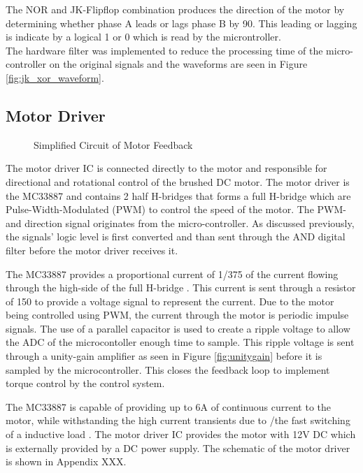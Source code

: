  The NOR and JK-Flipflop combination produces the direction of the motor by determining whether phase A leads or lags phase B by 90\textdegree. This leading or lagging is indicate by a logical 1 or 0 which is read by the microntroller.\\
 
 The hardware filter was implemented to reduce the processing time of the micro-controller on the original signals and the waveforms are seen in Figure \ref{fig:jk_xor_waveform}.



\subsection{Motor Driver}
\begin{figure}[h]
	\centering
	
	\caption{Simplified Circuit of Motor Feedback}
	\label{fig:feedback_current}
\end{figure}

The motor driver IC is connected directly to the motor and responsible for directional and rotational control of the brushed DC motor. The motor driver is the MC33887 and contains 2 half H-bridges that forms a full H-bridge which are Pulse-Width-Modulated (PWM) to control the speed of the motor. The PWM- and direction signal originates from the micro-controller. As discussed previously, the signals' logic level is first converted and than sent through the AND digital filter before the motor driver receives it.

The MC33887 provides a proportional current of 1/375 of the current flowing through the high-side of the full H-bridge \citep{motorIC}. This current is sent through a resistor of \SI{150}{\Omega} to provide a voltage signal to represent the current. Due to the motor being controlled using PWM, the current through the motor is periodic impulse signals. The use of a parallel capacitor is used to create a ripple voltage to allow the ADC of the microcontoller enough time to sample. This ripple voltage is sent through a unity-gain amplifier as seen in Figure \ref{fig:unitygain} before it is sampled by the microcontroller. This closes the feedback loop to implement torque control by the control system.

The MC33887 is capable of providing up to 6A of continuous current to the motor, while withstanding the high current transients due to /the fast switching of a inductive load \citep{motorIC}. The motor driver IC provides the motor with 12V DC which is externally provided by a DC power supply. The schematic of the motor driver is shown in Appendix XXX.

